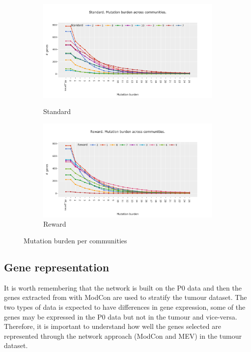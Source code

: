 \begin{figure}[!htb]
    \centering
    \begin{subfigure}[b]{1.0\textwidth}
        \includegraphics[width=\textwidth,keepaspectratio]{Sections/Network_I/Resources/P0/Comms/Mut_evo_Std_4k_v3.png}
        \label{fig:N_I:p0_std_mut_burden}
        \caption{Standard}
    \end{subfigure}
    \begin{subfigure}[b]{1.0\textwidth}
        \includegraphics[width=\textwidth,keepaspectratio]{Sections/Network_I/Resources/P0/Comms/Mut_evo_Rwd_4k_v3.png}
        \caption{Reward}
        \label{fig:N_I:p0_rwd_mut_burden}
    \end{subfigure}
    \caption{Mutation burden per communities}
    \label{fig:N_I:p0_mut_burden}
\end{figure}


\subsection{Gene representation}

It is worth remembering that the network is built on the P0 data and then the genes extracted from with ModCon are used to stratify the tumour dataset. The two types of data is expected to have differences in gene expression, some of the genes may be expressed in the P0 data but not in the tumour and vice-versa. Therefore, it is important to understand how well the genes selected are represented through the network approach (ModCon and MEV) in the tumour dataset. 


